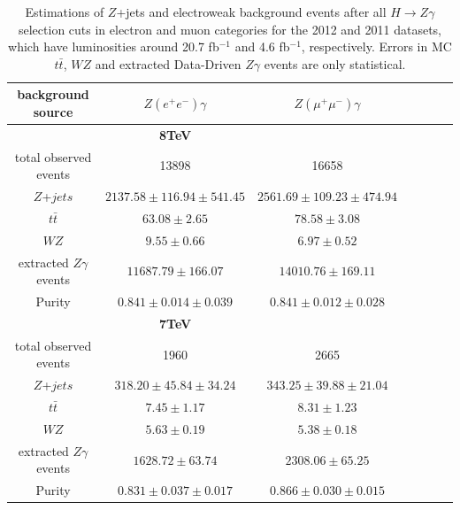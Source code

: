 \begin{table}[!htbp]
\centering
\caption{
 Estimations of $Z$+jets and electroweak background events after all $H\rightarrow Z \gamma$ selection cuts in electron and muon categories for the 2012 and 2011 datasets, which have luminosities around 20.7 fb$^{-1}$ and 4.6 fb$^{-1}$, respectively. Errors in MC $t\bar{t}$, $WZ$ and extracted Data-Driven $Z\gamma$ events are only statistical.}
  \label{tab:zgbgsummary}
\begin{tabular}{ccccccc}
       \hline
       \textbf{background source } & $Z(e^{+}e^{-})\gamma$  & $ Z( \mu^{+}\mu^{-})\gamma$ \\
       \hline
 	  &   {\bf 8TeV} &  \\
       \hline
	   
      total observed events & 13898    &  16658 \\
       \hline
        $Z$+$jets$             & $ 2137.58 \pm 116.94 \pm 541.45  $ &  $ 2561.69 \pm 109.23  \pm 474.94 $  \\
       $t\bar t$            &  $ 63.08 \pm 2.65 $&  $ 78.58 \pm 3.08 $ \\
 	$WZ $   	     &  $ 9.55 \pm 0.66 $ &  $ 6.97 \pm 0.52 $    \\
       \hline
   extracted $Z\gamma$ events  & $ 11687.79 \pm 166.07  $ &   $ 14010.76 \pm 169.11 $  \\
       \hline
 	Purity   		&  $ 0.841 \pm 0.014 \pm 0.039 $             &  $ 0.841 \pm  0.012 \pm 0.028$    \\
       \hline	 
       \hline
 	  &   {\bf 7TeV} &  \\
       \hline

      total observed events & 1960    &  2665 \\
       \hline
        $Z$+$jets$             & $ 318.20 \pm 45.84 \pm 34.24  $ &  $ 343.25 \pm 39.88  \pm 21.04 $  \\
       $t\bar t$            &  $ 7.45 \pm 1.17 $&  $ 8.31 \pm 1.23 $ \\
        $WZ $                &  $ 5.63 \pm 0.19 $ &  $ 5.38 \pm 0.18 $    \\
       \hline
   extracted $Z\gamma$ events  & $ 1628.72 \pm 63.74  $ &   $ 2308.06 \pm 65.25 $  \\
       \hline
        Purity                  &  $ 0.831 \pm 0.037 \pm 0.017 $             &  $ 0.866 \pm  0.030 \pm 0.015$    \\
   \hline
   \hline
      

\end{tabular}
\end{table}

